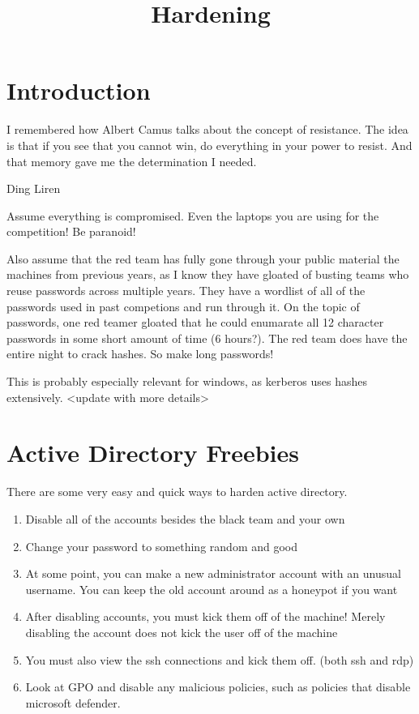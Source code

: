 \documentclass{article}
\begin{document}
\title{Hardening}

\graphicspath{ {./Images/} }
\tableofcontents

\section{Introduction}
\epigraph{I remembered how Albert Camus talks about the concept of resistance. 
The idea is that if you see that you cannot win, do everything in your power to resist. And that memory gave me the determination I needed.}
{Ding Liren}

Assume everything is compromised. Even the laptops you are using for the competition! Be paranoid!

Also assume that the red team has fully gone through your public material the machines from previous years, as
I know they have gloated of busting teams who reuse passwords across multiple years.
They have a wordlist of all of the passwords used in past competions and run through it. 
On the topic of passwords, one red teamer gloated that he could enumarate all 12 character passwords in some short amount of time (6 hours?).
The red team does have the entire night to crack hashes. So make long passwords!

This is probably especially relevant for windows, as kerberos uses hashes extensively. <update with more details>

\section{Active Directory Freebies}
There are some very easy and quick ways to harden active directory.

\begin{enumerate}
        \item Disable all of the accounts besides the black team and your own
        \item Change your password to something random and good
        \item At some point, you can make a new administrator account with an unusual username. You can keep the old account around as a honeypot if you want
        \item After disabling accounts, you must kick them off of the machine! Merely disabling the account does not kick the user off of the machine
        \item You must also view the ssh connections and kick them off. (both ssh and rdp)
        \item Look at GPO and disable any malicious policies, such as policies that disable microsoft defender.
\end{enumerate}
\end{document}
